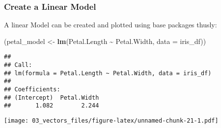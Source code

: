 \documentclass[
]{article}
\newenvironment{Shaded}{\begin{snugshade}}{\end{snugshade}}
\newcommand{\CommentTok}[1]{\textcolor[rgb]{0.56,0.35,0.01}{\textit{#1}}}
\newcommand{\DataTypeTok}[1]{\textcolor[rgb]{0.13,0.29,0.53}{#1}}
\newcommand{\DecValTok}[1]{\textcolor[rgb]{0.00,0.00,0.81}{#1}}
\newcommand{\KeywordTok}[1]{\textcolor[rgb]{0.13,0.29,0.53}{\textbf{#1}}}
\newcommand{\NormalTok}[1]{#1}
\newcommand{\OperatorTok}[1]{\textcolor[rgb]{0.81,0.36,0.00}{\textbf{#1}}}
\newcommand{\StringTok}[1]{\textcolor[rgb]{0.31,0.60,0.02}{#1}}
\begin{document}
\hypertarget{create-a-linear-model}{%
\subsubsection{Create a Linear Model}\label{create-a-linear-model}}

A linear Model can be created and plotted using base packages thusly:

\begin{Shaded}
\begin{Highlighting}[]
\NormalTok{(petal\_model <{-}}\StringTok{ }\KeywordTok{lm}\NormalTok{(Petal.Length }\OperatorTok{\textasciitilde{}}\StringTok{ }\NormalTok{Petal.Width, }\DataTypeTok{data =}\NormalTok{ iris\_df))}
\end{Highlighting}
\end{Shaded}

\begin{verbatim}
## 
## Call:
## lm(formula = Petal.Length ~ Petal.Width, data = iris_df)
## 
## Coefficients:
## (Intercept)  Petal.Width  
##       1.082        2.244
\end{verbatim}

\begin{Shaded}
\end{Shaded}

\texttt{[image: 03\_vectors\_files/figure-latex/unnamed-chunk-21-1.pdf]}
\end{document}
